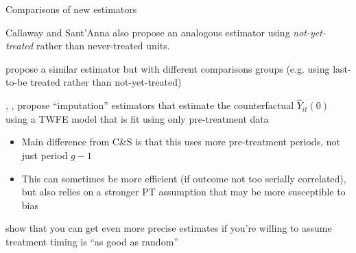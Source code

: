 \documentclass[aspectratio = 169, 13pt]{beamer}
\begin{document}
\begin{frame}{Comparisons of new estimators}
  \begin{wideitemize}
    \item
    Callaway and Sant'Anna also propose an analogous estimator using \textit{not-yet-treated} rather than never-treated units.

    \vspace{-3mm}
    \item
    \citet{sun_estimating_2020} propose a similar estimator but with different comparisons groups (e.g. using last-to-be treated rather than not-yet-treated)

    \vspace{-3mm}
    \item
    \citet{borusyak_revisiting_2021}, \citet{Wooldridge2021a}, \citet{gardner_two-stage_2021} propose ``imputation'' estimators that estimate the counterfactual $\hat{Y}_{it}(0)$ using a TWFE model that is fit using only pre-treatment data
    \begin{itemize}
      \item Main difference from C\&S is that this uses more pre-treatment periods, not just period $g-1$

      \item This can sometimes be more efficient (if outcome not too serially correlated), but also relies on a stronger PT assumption that may be more susceptible to bias
    \end{itemize}

    \vspace{-3mm}
    \item \citet{roth_efficient_2021} show that you can get even more precise estimates if you're willing to assume treatment timing is ``as good as random''

  \end{wideitemize}
\end{frame}
\end{document}
